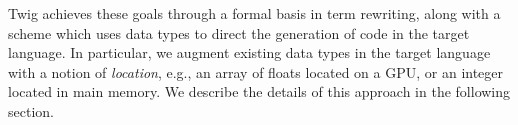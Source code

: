 Twig achieves these goals through a formal basis in term rewriting, along with
a scheme which uses data types to direct the generation of code in the target
language. In particular, we augment existing data types in the target language
with a notion of \emph{location}, e.g., an array of floats located on a GPU,
or an integer located in main memory. We describe the details of this approach
in the following section.

